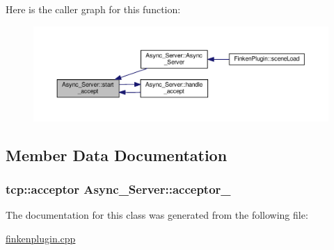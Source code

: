 Here is the caller graph for this function\+:\nopagebreak
\begin{figure}[H]
\begin{center}
\leavevmode
\includegraphics[width=350pt]{classAsync__Server_a475dc9277092d67f647cdfeeb91f2943_icgraph}
\end{center}
\end{figure}




\subsection{Member Data Documentation}
\subsubsection[{\texorpdfstring{acceptor\+\_\+}{acceptor_}}]{\setlength{\rightskip}{0pt plus 5cm}tcp\+::acceptor Async\+\_\+\+Server\+::acceptor\+\_\+\hspace{0.3cm}{\ttfamily [private]}}\hypertarget{classAsync__Server_a424476a9158c8e2290ce9c67bab6d48d}{}\label{classAsync__Server_a424476a9158c8e2290ce9c67bab6d48d}


The documentation for this class was generated from the following file\+:\begin{DoxyCompactItemize}
\item 
\hyperlink{finkenplugin_8cpp}{finkenplugin.\+cpp}\end{DoxyCompactItemize}
